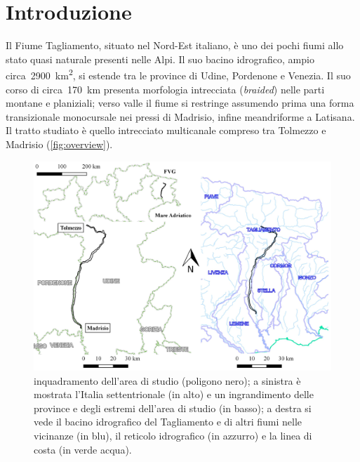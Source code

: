 \documentclass[12pt,a4paper,italian,twoside]{scrbook}
\begin{document}
\section{Introduzione}
Il Fiume Tagliamento, situato nel Nord-Est italiano, è uno dei pochi fiumi allo stato quasi naturale presenti nelle Alpi. 
Il suo bacino idrografico, ampio circa~\SI{2900}{\kilo\m\tothe{2}}, si estende tra le province di Udine, Pordenone e Venezia.
Il suo corso di circa~\SI{170}{\kilo\m} presenta morfologia intrecciata (\emph{braided}) nelle parti montane e planiziali; verso valle il fiume si restringe assumendo prima una forma transizionale monocursale nei pressi di Madrisio, infine meandriforme a Latisana.
\\
Il tratto studiato è quello intrecciato multicanale compreso tra Tolmezzo e Madrisio (\vref{fig:overview}).
%
\begin{figure}[b]
	\centering
	\includegraphics[width=\textwidth]{files/overview.jpeg}
	\caption[inquadramento dell'area di studio]
		{inquadramento dell'area di studio (poligono nero); a sinistra è mostrata l'Italia settentrionale (in alto) e un ingrandimento delle province e degli estremi dell'area di studio (in basso); a destra si vede il bacino idrografico del Tagliamento e di altri fiumi nelle vicinanze (in blu), il reticolo idrografico (in azzurro) e la linea di costa (in verde acqua).}
	\label{fig:overview}
\end{figure}
%
\end{document}
